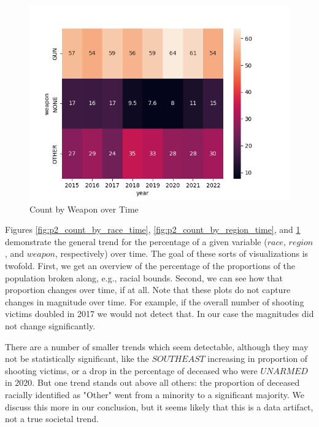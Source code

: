 \documentclass[12pt]{article}
\begin{document}
\begin{enumerate}[leftmargin=\labelsep]
  \begin{figure}[htb]
    \begin{center}
      \includegraphics[width=\textwidth]{media/Count_by_Weapon_over_Time.png}
    \end{center}
    \caption{Count by Weapon over Time}
    \label{fig:p2_count_by_weapon_time}
  \end{figure}
  
  Figures \ref{fig:p2_count_by_race_time}, \ref{fig:p2_count_by_region_time}, and \ref{fig:p2_count_by_weapon_time} demonstrate the
  general trend for the percentage of a given variable ($race$, $region$, and $weapon$, respectively) over time. The goal of these
  sorts of visualizations is twofold. First, we get an overview of the percentage of the proportions of the population broken along, e.g.,
  racial bounds. Second, we can see how that proportion changes over time, if at all. Note that these plots do not capture
  changes in magnitude over time. For example, if the overall number of shooting victims doubled in 2017 we would not detect that. In our
  case the magnitudes did not change significantly.
  
  There are a number of smaller trends which seem detectable, although they may not be statistically significant, like the $SOUTHEAST$
  increasing in proportion of shooting victims, or a drop in the percentage of deceased who were $UNARMED$ in $2020$. But one trend
  stands out above all others: the proportion of deceased racially identified as "Other" went from a minority to a significant majority.
  We discuss this more in our conclusion, but it seems likely that this is a data artifact, not a true societal trend.
  

\end{enumerate}
\end{document}
